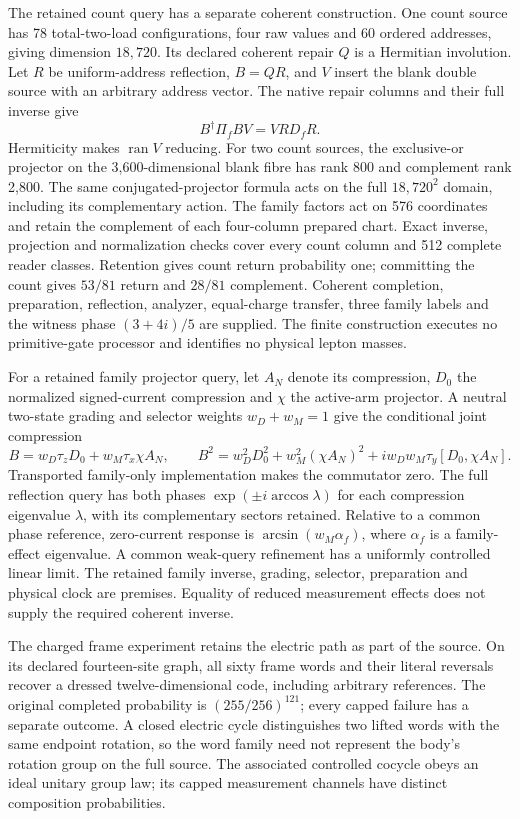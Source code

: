 The retained count query has a separate coherent construction. One count
source has 78 total-two-load configurations, four raw values and 60 ordered
addresses, giving dimension $18{,}720$. Its declared coherent repair $Q$ is
a Hermitian involution. Let $R$ be uniform-address reflection, $B=QR$, and
$V$ insert the blank double source with an arbitrary address vector. The
native repair columns and their full inverse give
\[
 B^\dagger\Pi_f BV=VRD_fR.
\]
Hermiticity makes $\operatorname{ran}V$ reducing. For two count sources,
the exclusive-or projector on the 3,600-dimensional blank fibre has rank
800 and complement rank 2,800. The same conjugated-projector formula acts
on the full $18{,}720^2$ domain, including its complementary action.
The family factors act on 576 coordinates and retain the complement of
each four-column prepared chart. Exact inverse, projection and normalization
checks cover every count column and 512 complete reader classes. Retention
gives count return probability one; committing the count gives $53/81$
return and $28/81$ complement. Coherent completion, preparation, reflection,
analyzer, equal-charge transfer, three family labels and the witness phase
$(3+4i)/5$ are supplied. The finite construction executes no primitive-gate
processor and identifies no physical lepton masses.

For a retained family projector query, let $A_N$ denote its compression,
$D_0$ the normalized signed-current compression and $\chi$ the active-arm
projector. A neutral two-state grading and selector weights
$w_D+w_M=1$ give the conditional joint compression
\[
 B=w_D\tau_zD_0+w_M\tau_x\chi A_N,\qquad
 B^2=w_D^2D_0^2+w_M^2(\chi A_N)^2
       +i w_Dw_M\tau_y[D_0,\chi A_N].
\]
Transported family-only implementation makes the commutator zero. The full
reflection query has both phases $\exp(\pm i\arccos\lambda)$ for each
compression eigenvalue $\lambda$, with its complementary sectors retained.
Relative to a common phase reference, zero-current response is
$\arcsin(w_M\alpha_f)$, where $\alpha_f$ is a family-effect eigenvalue.
A common weak-query refinement has a uniformly controlled linear limit.
The retained family inverse, grading, selector, preparation and physical
clock are premises. Equality of reduced measurement effects does not supply
the required coherent inverse.

The charged frame experiment retains the electric path as part of the
source. On its declared fourteen-site graph, all sixty frame words and their
literal reversals recover a dressed twelve-dimensional code, including
arbitrary references. The original completed probability is $(255/256)^{121}$;
every capped failure has a separate outcome. A closed electric cycle
distinguishes two lifted words with the same endpoint rotation, so the
word family need not represent the body's rotation group on the full source.
The associated controlled cocycle obeys an ideal unitary group law; its
capped measurement channels have distinct composition probabilities.

